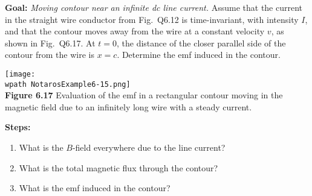 \documentclass[../../header.tex]{subfiles}
\begin{document}
\textbf{Goal:} \textit{Moving contour near an infinite dc line current.} Assume that the current in the straight wire conductor from Fig.~Q6.12 is time-invariant, with intensity $I$, and that the contour moves away from the wire at a constant velocity $v$, as shown in Fig.~Q6.17. At $t = 0$, the distance of the closer parallel side of the contour from the wire is $x = c$. Determine the emf induced in the contour.
\begin{center}
\texttt{[image: \\wpath NotarosExample6-15.png]}\\
\textbf{Figure 6.17} Evaluation of the emf in a rectangular contour moving in the magnetic field due to an infinitely long wire with a steady current.
\end{center}
\textbf{Steps:} 
\begin{enumerate}
\item What is the $B$-field everywhere due to the line current?


\item What is the total magnetic flux through the contour?


\item What is the emf induced in the contour?


\end{enumerate}
\end{document}
